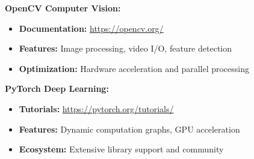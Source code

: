 \documentclass[12pt,a4paper]{article}
\begin{document}
\textbf{OpenCV Computer Vision:}
\begin{itemize}
    \item \textbf{Documentation:} \url{https://opencv.org/}
    \item \textbf{Features:} Image processing, video I/O, feature detection
    \item \textbf{Optimization:} Hardware acceleration and parallel processing
\end{itemize}

\textbf{PyTorch Deep Learning:}
\begin{itemize}
    \item \textbf{Tutorials:} \url{https://pytorch.org/tutorials/}
    \item \textbf{Features:} Dynamic computation graphs, GPU acceleration
    \item \textbf{Ecosystem:} Extensive library support and community
\end{itemize}
\end{document}
